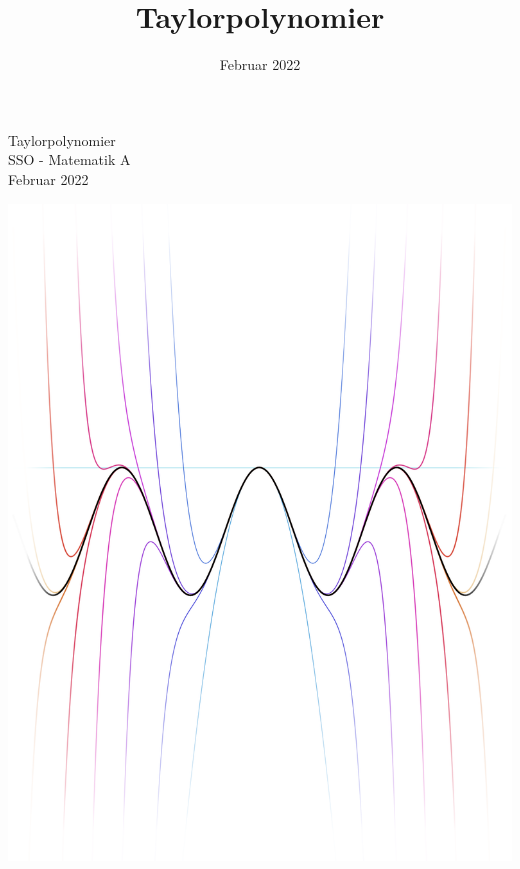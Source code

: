 \documentclass[12pt, a4paper]{article}
\title{Taylorpolynomier}
\date{Februar 2022}
\begin{document}
\begin{titlepage}
   \centering
    \vfill
    {\huge 
    Taylorpolynomier\\
    \vspace{0.5cm}
    \large
    SSO - Matematik A\\
    \vspace{0.25cm}
    Februar 2022
    }    
    \vfill
   
    \includegraphics[width=\textwidth]{figures/forside4edit.png} %
    \vfill
    \vfill
\thispagestyle{empty}

\end{titlepage}
\end{document}
